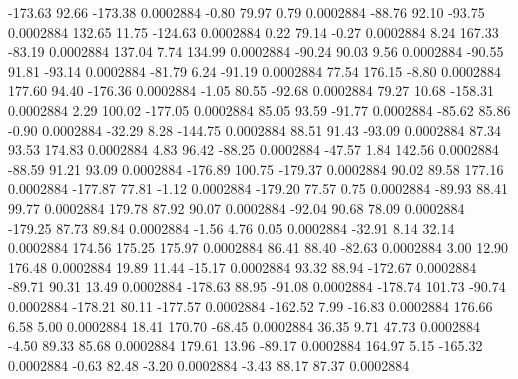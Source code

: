      -173.63       92.66     -173.38     0.0002884
       -0.80       79.97        0.79     0.0002884
      -88.76       92.10      -93.75     0.0002884
      132.65       11.75     -124.63     0.0002884
        0.22       79.14       -0.27     0.0002884
        8.24      167.33      -83.19     0.0002884
      137.04        7.74      134.99     0.0002884
      -90.24       90.03        9.56     0.0002884
      -90.55       91.81      -93.14     0.0002884
      -81.79        6.24      -91.19     0.0002884
       77.54      176.15       -8.80     0.0002884
      177.60       94.40     -176.36     0.0002884
       -1.05       80.55      -92.68     0.0002884
       79.27       10.68     -158.31     0.0002884
        2.29      100.02     -177.05     0.0002884
       85.05       93.59      -91.77     0.0002884
      -85.62       85.86       -0.90     0.0002884
      -32.29        8.28     -144.75     0.0002884
       88.51       91.43      -93.09     0.0002884
       87.34       93.53      174.83     0.0002884
        4.83       96.42      -88.25     0.0002884
      -47.57        1.84      142.56     0.0002884
      -88.59       91.21       93.09     0.0002884
     -176.89      100.75     -179.37     0.0002884
       90.02       89.58      177.16     0.0002884
     -177.87       77.81       -1.12     0.0002884
     -179.20       77.57        0.75     0.0002884
      -89.93       88.41       99.77     0.0002884
      179.78       87.92       90.07     0.0002884
      -92.04       90.68       78.09     0.0002884
     -179.25       87.73       89.84     0.0002884
       -1.56        4.76        0.05     0.0002884
      -32.91        8.14       32.14     0.0002884
      174.56      175.25      175.97     0.0002884
       86.41       88.40      -82.63     0.0002884
        3.00       12.90      176.48     0.0002884
       19.89       11.44      -15.17     0.0002884
       93.32       88.94     -172.67     0.0002884
      -89.71       90.31       13.49     0.0002884
     -178.63       88.95      -91.08     0.0002884
     -178.74      101.73      -90.74     0.0002884
     -178.21       80.11     -177.57     0.0002884
     -162.52        7.99      -16.83     0.0002884
      176.66        6.58        5.00     0.0002884
       18.41      170.70      -68.45     0.0002884
       36.35        9.71       47.73     0.0002884
       -4.50       89.33       85.68     0.0002884
      179.61       13.96      -89.17     0.0002884
      164.97        5.15     -165.32     0.0002884
       -0.63       82.48       -3.20     0.0002884
       -3.43       88.17       87.37     0.0002884
